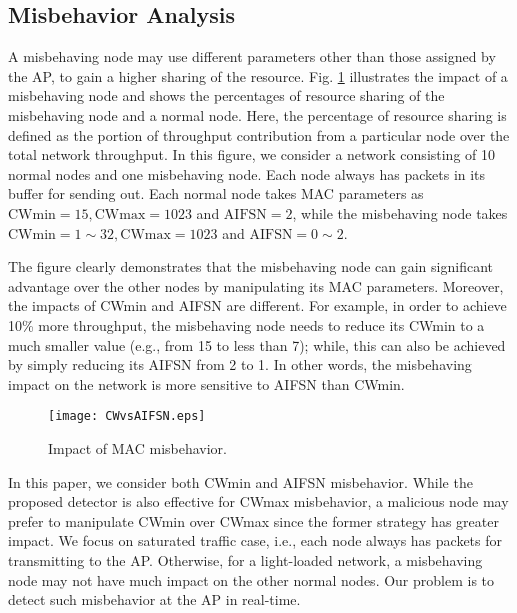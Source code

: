 \documentclass[conference]{IEEEtran}
\begin{document}
\subsection{Misbehavior Analysis}
A misbehaving node may use different parameters other than those assigned by the AP, to gain a higher sharing of the resource. Fig. \ref{fig:CWvsAIFSN} illustrates the impact of a misbehaving node and shows the percentages of resource sharing of the misbehaving node and a normal node. Here, the percentage of resource sharing is defined as the portion of throughput contribution from a particular node over the total network throughput. In this figure, we consider a network consisting of 10 normal nodes and one misbehaving node. Each node always has packets in its buffer for sending out. Each normal node takes MAC parameters as $\textrm{CWmin}=15,\textrm{CWmax}=1023$ and $\textrm{AIFSN}=2$, while the misbehaving node takes $\textrm{CWmin}=1\sim 32,\textrm{CWmax}=1023$ and $\textrm{AIFSN}=0\sim 2$.

The figure clearly demonstrates that the misbehaving node can gain significant advantage over the other nodes by manipulating its MAC parameters. Moreover, the impacts of CWmin and AIFSN are different. For example, in order to achieve 10\% more throughput, the misbehaving node needs to reduce its CWmin to a much smaller value (e.g., from 15 to less than 7); while, this can also be achieved by simply reducing its AIFSN from 2 to 1. In other words, the misbehaving impact on the network is more sensitive to AIFSN than CWmin.
\begin{figure}[htbp]
\vspace{-3mm}
  \centering
  \texttt{[image: CWvsAIFSN.eps]}
\vspace{-4mm}
  \caption{Impact of MAC misbehavior.}\label{fig:CWvsAIFSN}
\vspace{-3mm}
\end{figure}

In this paper, we consider both CWmin and AIFSN misbehavior. While the proposed detector is also effective for CWmax misbehavior, a malicious node may prefer to manipulate CWmin over CWmax since the former strategy has greater impact. We focus on saturated traffic case, i.e., each node always has packets for transmitting to the AP. Otherwise, for a light-loaded network, a misbehaving node may not have much impact on the other normal nodes. Our problem is to detect such misbehavior at the AP in real-time.
\end{document}
